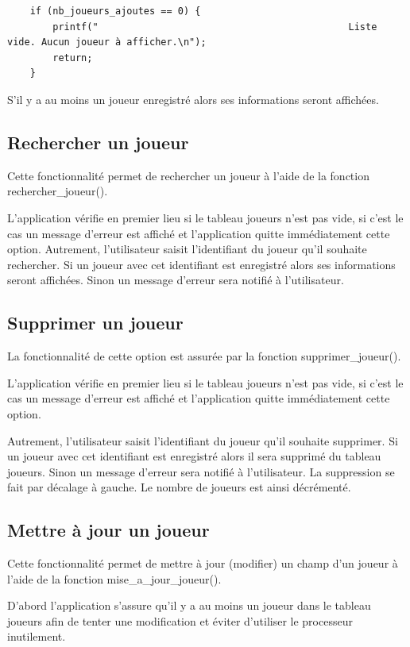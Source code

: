 \documentclass[12pt,a4paper]{report}
\begin{document}
\begin{lstlisting}
	if (nb_joueurs_ajoutes == 0) {
		printf("                                            Liste vide. Aucun joueur à afficher.\n");
		return;
	}
\end{lstlisting} 
S'il y a au moins un joueur enregistré alors ses informations seront affichées.

\subsection{Rechercher un joueur}
Cette fonctionnalité permet de rechercher un joueur à l'aide de la fonction rechercher\_joueur().

L'application vérifie en premier lieu si le tableau joueurs n'est pas vide, si c'est le cas un message d'erreur est affiché et l'application quitte immédiatement cette option.
Autrement, l'utilisateur saisit l'identifiant du joueur qu'il souhaite rechercher. Si un joueur avec cet identifiant est enregistré alors ses informations seront affichées. Sinon un message d'erreur sera notifié à l'utilisateur.

\subsection{Supprimer un joueur}
La fonctionnalité de cette option est assurée par la fonction supprimer\_joueur(). 

L'application vérifie en premier lieu si le tableau joueurs n'est pas vide, si c'est le cas un message d'erreur est affiché et l'application quitte immédiatement cette option.

Autrement, l'utilisateur saisit l'identifiant du joueur qu'il souhaite supprimer. Si un joueur avec cet identifiant est enregistré alors il sera supprimé du tableau joueurs. Sinon un message d'erreur sera notifié à l'utilisateur. 
La suppression se fait par décalage à gauche. Le nombre de joueurs est ainsi décrémenté.

\subsection{Mettre à jour un joueur}
Cette fonctionnalité permet de mettre à jour (modifier) un champ d'un joueur à l'aide de la fonction mise\_a\_jour\_joueur().

D'abord l'application s'assure qu'il y a au moins un joueur dans le tableau joueurs afin de tenter une modification et éviter d'utiliser le processeur inutilement.
\end{document}
